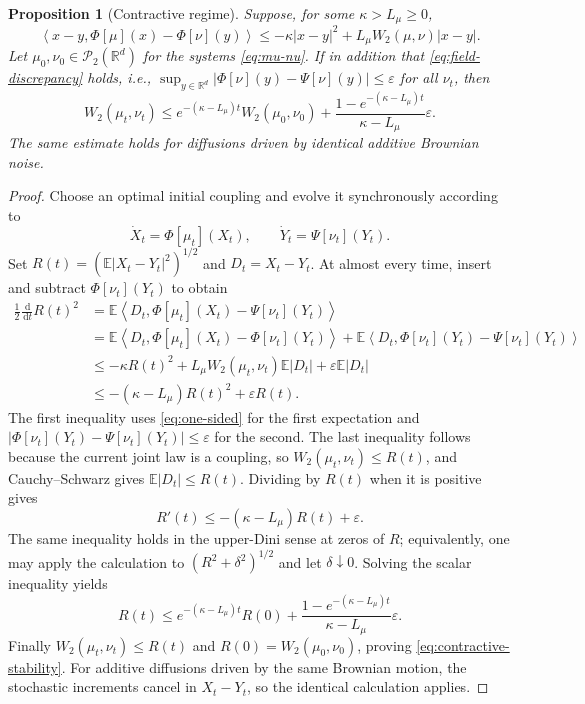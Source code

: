 \documentclass[11pt]{amsart}
\numberwithin{equation}{section}
\theoremstyle{plain}
\newtheorem{proposition}[theorem]{Proposition}
\newcommand{\R}{\mathbb{R}}
\newcommand{\E}{\mathbb{E}}
\newcommand{\cP}{\mathcal{P}}
\newcommand{\dd}{\,\mathrm{d}}
\newcommand{\abs}[1]{\left\lvert#1\right\rvert}
\newcommand{\ip}[2]{\left\langle#1,#2\right\rangle}
\begin{document}
\begin{proposition}[Contractive regime]\label{prop:contractive}
Suppose, for some $\kappa>L_\mu\geq0$,
\begin{equation}\label{eq:one-sided}
 \ip{x-y}{\Phi[\mu](x)-\Phi[\nu](y)}
 \leq-\kappa\abs{x-y}^2
      +L_\mu W_2(\mu,\nu)\abs{x-y}.
\end{equation}
Let $\mu_0,\nu_0\in\cP_2(\R^d)$ for the systems \eqref{eq:mu-nu}. If in addition that \eqref{eq:field-discrepancy} holds, i.e., $\sup_{y\in\R^d}|\Phi[\nu](y)-\Psi[\nu](y)|\leq\varepsilon$ for all $\nu_t$, then
\begin{equation}\label{eq:contractive-stability}
 W_2(\mu_t,\nu_t)
 \leq e^{-(\kappa-L_\mu)t}W_2(\mu_0,\nu_0)
 +\frac{1-e^{-(\kappa-L_\mu)t}}{\kappa-L_\mu}\varepsilon.
\end{equation}
The same estimate holds for diffusions driven by identical additive Brownian
noise. 
\end{proposition}
\begin{proof}
Choose an optimal initial coupling and evolve it synchronously according to
\[
 \dot X_t=\Phi[\mu_t](X_t),\qquad
 \dot Y_t=\Psi[\nu_t](Y_t).
\]
Set $R(t)=(\E\abs{X_t-Y_t}^2)^{1/2}$ and $D_t=X_t-Y_t$.
At almost every time, insert and subtract $\Phi[\nu_t](Y_t)$ to obtain
\[
\begin{aligned}
 \frac12\frac{\dd}{\dd t}R(t)^2
 &=\E\left\langle D_t,
   \Phi[\mu_t](X_t)-\Psi[\nu_t](Y_t)\right\rangle\\
 &=\E\left\langle D_t,
   \Phi[\mu_t](X_t)-\Phi[\nu_t](Y_t)\right\rangle
   +\E\left\langle D_t,
   \Phi[\nu_t](Y_t)-\Psi[\nu_t](Y_t)\right\rangle\\
 &\leq-\kappa R(t)^2
   +L_\mu W_2(\mu_t,\nu_t)\E\abs{D_t}
   +\varepsilon\E\abs{D_t}\\
 &\leq-(\kappa-L_\mu)R(t)^2+\varepsilon R(t).
 \end{aligned}
\]
The first inequality uses \eqref{eq:one-sided} for the first
expectation and
$|\Phi[\nu_t](Y_t)-\Psi[\nu_t](Y_t)|\leq\varepsilon$ for the second.
The last inequality follows because the current joint law is a coupling, so
$W_2(\mu_t,\nu_t)\leq R(t)$, and Cauchy--Schwarz gives
$\E|D_t|\leq R(t)$.
Dividing by $R(t)$ when it is positive gives
\[
 R'(t)\leq-(\kappa-L_\mu)R(t)+\varepsilon.
\]
The same inequality holds in the upper-Dini sense at zeros of $R$; equivalently,
one may apply the calculation to $(R^2+\delta^2)^{1/2}$ and let
$\delta\downarrow0$.  Solving the scalar inequality yields
\[
 R(t)\leq e^{-(\kappa-L_\mu)t}R(0)
 +\frac{1-e^{-(\kappa-L_\mu)t}}{\kappa-L_\mu}\varepsilon.
\]
Finally $W_2(\mu_t,\nu_t)\leq R(t)$ and
$R(0)=W_2(\mu_0,\nu_0)$, proving \eqref{eq:contractive-stability}.
For additive diffusions driven by the same Brownian motion, the stochastic
increments cancel in $X_t-Y_t$, so the identical calculation applies.
\end{proof}
\end{document}
